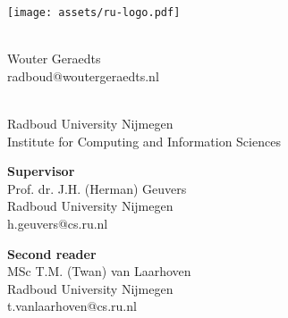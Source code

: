 \begin{titlepage}
	\begin{minipage}{0.50\linewidth}
		\begin{center}
			\texttt{[image: assets/ru-logo.pdf]}
		\end{center}
	\end{minipage}
	
	\vspace{13em}
	
	\makeatletter
	\begin{center}
		\begin{minipage}{0.75\linewidth}
			\begin{center}
				\huge \@title \vspace{2.5em} \\
				\huge Wouter Geraedts \vspace{0.5em} \\
				\large radboud@woutergeraedts.nl \vspace{2em} \\
				\large \@date
			\end{center}
		\end{minipage}
	\end{center}
	\makeatother
	
	\vspace{15.5em}
	
	\noindent \begin{minipage}{\linewidth}
		\textbf{\Ms} \vspace{0.5em} \\
		Radboud University Nijmegen \\
		Institute for Computing and Information Sciences
	\end{minipage}
	
	\vspace{3em}
	
	\noindent \begin{minipage}{0.45\linewidth}
		\textbf{Supervisor} \\
		Prof. dr. J.H. (Herman) Geuvers \\
		Radboud University Nijmegen \\
		h.geuvers@cs.ru.nl \\
	\end{minipage}
	\hspace{0.10\linewidth}
	\begin{minipage}{0.45\linewidth}
		\textbf{Second reader} \\
		MSc T.M. (Twan) van Laarhoven \\
		Radboud University Nijmegen \\
		t.vanlaarhoven@cs.ru.nl \\
	\end{minipage}
\end{titlepage}
\restoregeometry
